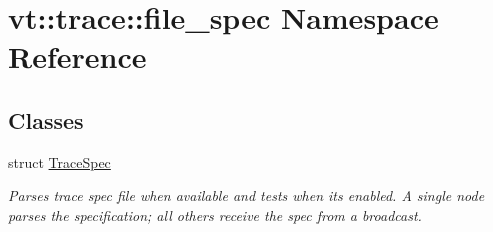 \hypertarget{namespacevt_1_1trace_1_1file__spec}{}\section{vt\+:\+:trace\+:\+:file\+\_\+spec Namespace Reference}
\label{namespacevt_1_1trace_1_1file__spec}
\subsection*{Classes}
\begin{DoxyCompactItemize}
\item 
struct \hyperlink{structvt_1_1trace_1_1file__spec_1_1_trace_spec}{Trace\+Spec}
\begin{DoxyCompactList}\small\item\em Parses trace spec file when available and tests when its enabled. A single node parses the specification; all others receive the spec from a broadcast. \end{DoxyCompactList}\end{DoxyCompactItemize}
